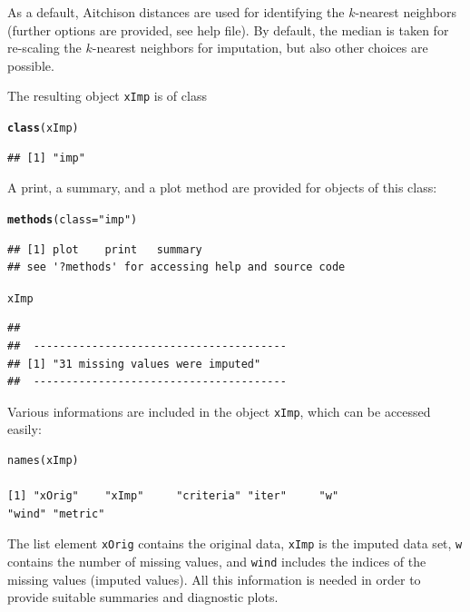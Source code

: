 \documentclass{scrartcl}\usepackage[]{graphicx}\usepackage[]{color}
\makeatletter
\newcommand{\hlstr}[1]{\textcolor[rgb]{0.192,0.494,0.8}{#1}}%
\newcommand{\hlstd}[1]{\textcolor[rgb]{0.345,0.345,0.345}{#1}}%
\newcommand{\hlkwc}[1]{\textcolor[rgb]{0.333,0.667,0.333}{#1}}%
\newcommand{\hlkwd}[1]{\textcolor[rgb]{0.737,0.353,0.396}{\textbf{#1}}}%
\newenvironment{kframe}{%
 \def\at@end@of@kframe{}%
 \ifinner\ifhmode%
  \def\at@end@of@kframe{\end{minipage}}%
  \begin{minipage}{\columnwidth}%
 \fi\fi%
 \def\FrameCommand##1{\hskip\@totalleftmargin \hskip-\fboxsep
 \colorbox{shadecolor}{##1}\hskip-\fboxsep
     \hskip-\linewidth \hskip-\@totalleftmargin \hskip\columnwidth}%
 \MakeFramed {\advance\hsize-\width
   \@totalleftmargin\z@ \linewidth\hsize
   \@setminipage}}%
 {\par\unskip\endMakeFramed%
 \at@end@of@kframe}
\newenvironment{knitrout}{}{} %
\makeatother
\begin{document}
As a default, Aitchison distances are used for identifying the $k$-nearest neighbors
(further options are provided, see help file). By default, the median is
taken for re-scaling the $k$-nearest neighbors for imputation, but also other
choices are possible.

The resulting object \texttt{xImp} is of class
\begin{knitrout}
\color{fgcolor}\begin{kframe}
\begin{alltt}
\hlkwd{class}\hlstd{(xImp)}
\end{alltt}
\begin{verbatim}
## [1] "imp"
\end{verbatim}
\end{kframe}
\end{knitrout}

A print, a summary, and a plot method are provided for objects of this class:
\begin{knitrout}
\color{fgcolor}\begin{kframe}
\begin{alltt}
\hlkwd{methods}\hlstd{(}\hlkwc{class} \hlstd{=} \hlstr{"imp"}\hlstd{)}
\end{alltt}
\begin{verbatim}
## [1] plot    print   summary
## see '?methods' for accessing help and source code
\end{verbatim}
\begin{alltt}
\hlstd{xImp}
\end{alltt}
\begin{verbatim}
## 
##  --------------------------------------- 
## [1] "31 missing values were imputed"
##  ---------------------------------------
\end{verbatim}
\end{kframe}
\end{knitrout}

Various informations are included in the object \texttt{xImp}, which can be accessed easily:

\begin{verbatim}
names(xImp)

[1] "xOrig"    "xImp"     "criteria" "iter"     "w"
"wind" "metric"
\end{verbatim} 

The list element \texttt{xOrig} contains the original data, \texttt{xImp}
is the imputed data set, \texttt{w} contains the number of missing values,
and \texttt{wind} includes the indices of the missing values
(imputed values).
All this information is needed in order to provide suitable summaries and
diagnostic plots.
\end{document}
